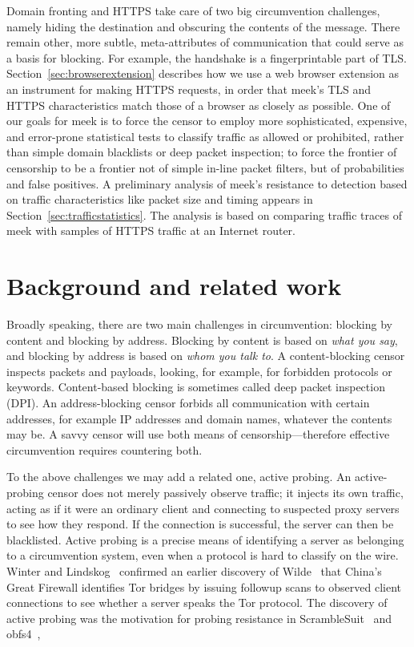 \documentclass[conference]{IEEEtran}
\begin{document}
Domain fronting and HTTPS take care of two big circumvention challenges,
namely hiding the destination and obscuring the contents of the message.
There remain other, more subtle, meta-attributes of communication
that could serve as a basis for blocking.
For example, the handshake is a fingerprintable part of TLS.
Section~\ref{sec:browserextension} describes how we use a web browser extension as an instrument for making HTTPS requests,
in order that meek's TLS and HTTPS characteristics
match those of a browser as closely as possible.
One of our goals for meek is to force the censor
to employ more sophisticated, expensive, and error-prone statistical tests
to classify traffic as allowed or prohibited,
rather than simple domain blacklists or deep packet inspection;
to force the frontier of censorship
to be a frontier not of simple in-line packet filters,
but of probabilities and false positives.
A preliminary analysis of meek's resistance to detection
based on traffic characteristics like packet size and timing
appears in Section~\ref{sec:trafficstatistics}.
The analysis is based on comparing traffic traces of meek
with samples of HTTPS traffic at an Internet router.


\section{Background and related work}
\label{sec:related-work}

Broadly speaking, there are two main challenges in circumvention:
blocking by content and blocking by address.
Blocking by content is based on \emph{what you say},
and blocking by address is based on \emph{whom you talk to}.
A content-blocking censor inspects packets and payloads,
looking, for example, for forbidden protocols or keywords.
Content-based blocking is sometimes called deep packet inspection (DPI).
An address-blocking censor forbids all communication with certain
addresses, for example IP addresses and domain names, whatever the contents may be.
A savvy censor will use both means of censorship---therefore
effective circumvention requires countering both.

To the above challenges we may add a related one, active probing.
An active-probing censor does not merely passively observe traffic;
it injects its own traffic,
acting as if it were an ordinary client and connecting to suspected
proxy servers to see how they respond.
If the connection is successful, the server can then be blacklisted.
Active probing is a precise means of identifying a server as belonging to a circumvention system,
even when a protocol is hard to classify on the wire.
Winter and Lindskog~\cite{foci12-winter} confirmed an earlier discovery of
Wilde~\cite{wilde} that China's Great Firewall identifies Tor bridges
by issuing followup scans to observed client connections to see
whether a server speaks the Tor protocol.
The discovery of active probing was the motivation for probing resistance in ScrambleSuit~\cite{scramblesuit}
and obfs4~\cite{obfs4},
\end{document}
